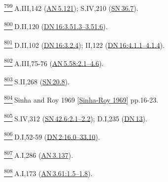 \label{footprints_split_025.html_fn799}
\hyperref[footprints_split_019.htmlux5cux23fnref799]{\textsuperscript{799}} A.III,142
(\href{https://suttacentral.net/an5.121/en/sujato}{AN\,5.121}); S.IV,210
(\href{https://suttacentral.net/sn36.7/en/sujato}{SN\,36.7}).

\label{footprints_split_025.html_fn800}
\hyperref[footprints_split_019.htmlux5cux23fnref800]{\textsuperscript{800}} D.II,120
(\href{https://suttacentral.net/dn16/en/sujato\#3.51.3}{DN\,16:3.51.3--3.51.6}).

\label{footprints_split_025.html_fn801}
\hyperref[footprints_split_019.htmlux5cux23fnref801]{\textsuperscript{801}} D.II,102
(\href{https://suttacentral.net/dn16/en/sujato\#3.2.4}{DN\,16:3.2.4});
II,122
(\href{https://suttacentral.net/dn16/en/sujato\#4.1.1}{DN\,16:4.1.1--4.1.4}).

\label{footprints_split_025.html_fn802}
\hyperref[footprints_split_019.htmlux5cux23fnref802]{\textsuperscript{802}} A.III,75-76
(\href{https://suttacentral.net/an5.58/en/sujato\#2.1}{AN\,5.58:2.1--4.6}).

\label{footprints_split_025.html_fn803}
\hyperref[footprints_split_019.htmlux5cux23fnref803]{\textsuperscript{803}} S.II,268
(\href{https://suttacentral.net/sn20.8/en/sujato}{SN\,20.8}).

\label{footprints_split_025.html_fn804}
\hyperref[footprints_split_019.htmlux5cux23fnref804]{\textsuperscript{804}} {Sinha
and Roy 1969
{{[}\hyperref[footprints_split_022.htmlux5cux23Sinha-Royux5cux25201969]{Sinha-Roy
1969}{]}}} pp.16-23.

\label{footprints_split_025.html_fn805}
\hyperref[footprints_split_020.htmlux5cux23fnref805]{\textsuperscript{805}} S.IV,312
(\href{https://suttacentral.net/sn42.6/en/sujato\#2.1}{SN\,42.6:2.1--2.2});
D.I,235 (\href{https://suttacentral.net/dn13/en/sujato}{DN\,13}).

\label{footprints_split_025.html_fn806}
\hyperref[footprints_split_020.htmlux5cux23fnref806]{\textsuperscript{806}} D.I,52-59
(\href{https://suttacentral.net/dn2/en/sujato\#16.0}{DN\,2:16.0--33.10}).

\label{footprints_split_025.html_fn807}
\hyperref[footprints_split_020.htmlux5cux23fnref807]{\textsuperscript{807}} A.I,286
(\href{https://suttacentral.net/an3.137/en/sujato}{AN\,3.137}).

\label{footprints_split_025.html_fn808}
\hyperref[footprints_split_020.htmlux5cux23fnref808]{\textsuperscript{808}} A.I,173
(\href{https://suttacentral.net/an3.61/en/sujato\#1.5}{AN\,3.61:1.5--1.8}).

